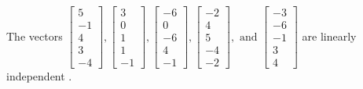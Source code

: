 \begin{exercise}
\begin{exerciseStatement}
  \end{exerciseStatement}
  \begin{exerciseAnswer}
   The vectors \(\left[\begin{array}{r}
5 \\
-1 \\
4 \\
3 \\
-4
\end{array}\right] , \left[\begin{array}{r}
3 \\
0 \\
1 \\
1 \\
-1
\end{array}\right] , \left[\begin{array}{r}
-6 \\
0 \\
-6 \\
4 \\
-1
\end{array}\right] , \left[\begin{array}{r}
-2 \\
4 \\
5 \\
-4 \\
-2
\end{array}\right] , \text{ and } \left[\begin{array}{r}
-3 \\
-6 \\
-1 \\
3 \\
4
\end{array}\right]\) are 
  	 linearly independent  .
  


  \end{exerciseAnswer}
\end{exercise}